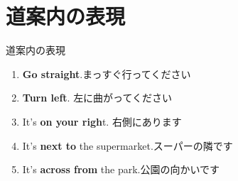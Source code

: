 \documentclass[aspectratio=169,xcolor={dvipsnames,table}]{beamer}
\begin{document}
\section{道案内の表現}
\begin{frame}[plain]{道案内の表現}
 \begin{enumerate}
  \item \textbf{Go straight}.{\small まっすぐ行ってください}
  \item \textbf{Turn left}. {\small 左に曲がってください}
  \item It's \textbf{on your righ}t. {\small 右側にあります}
  \item It's \textbf{next to} the supermarket.{\small スーパーの隣です}
  \item It's \textbf{across from} the park.{\small 公園の向かいです}
 \end{enumerate}

\hfill{\scriptsize {}}
\end{frame}
\end{document}

